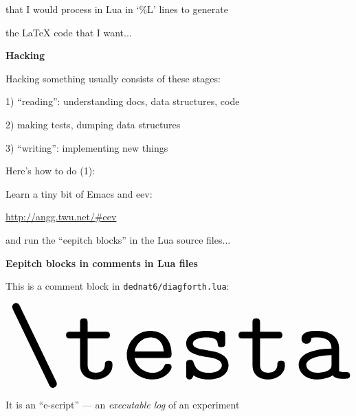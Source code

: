 \documentclass[oneside]{book}
\begin{document}
that I would process in Lua in `{\%L}' lines to generate

the \LaTeX{} code that I want...

\newpage


{\bf Hacking}

Hacking something usually consists of these stages:

1) ``reading'': understanding docs, data structures, code

2) making tests, dumping data structures

3) ``writing'': implementing new things

\msk

Here's how to do (1):

Learn a tiny bit of Emacs and eev:

\url{http://angg.twu.net/\#eev}

and run the ``eepitch blocks'' in the Lua source files...




\newpage

%

{\bf Eepitch blocks in comments in Lua files}

This is a comment block in {\tt dednat6/diagforth.lua}:

%
\pu
$\myvcenter{\resizebox{!}{80pt}{\testa}}
$

It is an ``e-script'' --- an {\sl executable log} of an experiment
\end{document}
